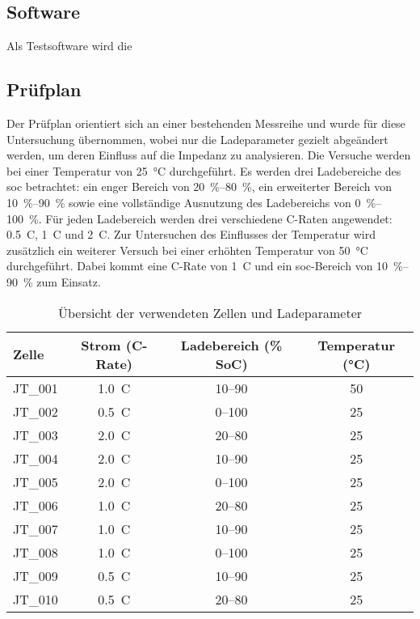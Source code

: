 \subsection{Software}
\label{subsec:software-bio}
Als Testsoftware wird die

\subsection{Prüfplan}
\label{subsec:pruefplan-bio}
Der Prüfplan orientiert sich an einer bestehenden Messreihe und wurde für diese Untersuchung übernommen, wobei nur
die Ladeparameter gezielt abgeändert werden, um deren Einfluss auf die Impedanz zu analysieren.
Die Versuche werden bei einer Temperatur von \SI{25}{\celsius} durchgeführt.
Es werden drei Ladebereiche des \gls{soc} betrachtet: ein enger Bereich von \SIrange{20}{80}{\percent}, ein
erweiterter Bereich von \SIrange{10}{90}{\percent} sowie eine vollständige Ausnutzung des Ladebereichs von
\SIrange{0}{100}{\percent}.
Für jeden Ladebereich werden drei verschiedene C-Raten angewendet: \SI{0,5}{C}, \SI{1}{C} und \SI{2}{C}.
Zur Untersuchen des Einflusses der Temperatur wird zusätzlich ein weiterer Versuch bei einer erhöhten Temperatur von
\SI{50}{\celsius} durchgeführt.
Dabei kommt eine C-Rate von \SI{1}{C} und ein \gls{soc}-Bereich von \SIrange{10}{90}{\percent} zum Einsatz.

\begin{table}[h]
    \centering
    \begin{tabular}{lccc}
        \toprule
        Zelle     & Strom (C-Rate) &  Ladebereich (\% SoC)       & Temperatur (\si{\degreeCelsius}) \\
        \midrule
        JT\_001   & \SI{1.0}{C}    & 10–90                & 50 \\
        JT\_002   & \SI{0.5}{C}    & 0–100                & 25 \\
        JT\_003   & \SI{2.0}{C}    & 20–80                & 25 \\
        JT\_004   & \SI{2.0}{C}    & 10–90                & 25 \\
        JT\_005   & \SI{2.0}{C}    & 0–100                & 25 \\
        JT\_006   & \SI{1.0}{C}    & 20–80                & 25 \\
        JT\_007   & \SI{1.0}{C}    & 10–90                & 25 \\
        JT\_008   & \SI{1.0}{C}    & 0–100                & 25 \\
        JT\_009   & \SI{0.5}{C}    & 10–90                & 25 \\
        JT\_010   & \SI{0.5}{C}    & 20–80                & 25 \\
        \bottomrule
    \end{tabular}
    \caption{Übersicht der verwendeten Zellen und Ladeparameter}
    \label{tab:ladeparameter_gesamt}
\end{table}

